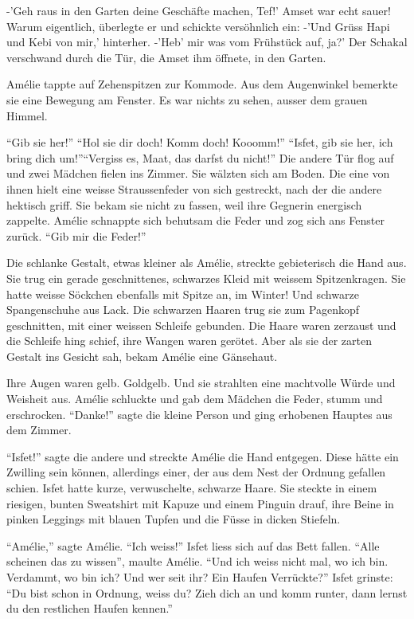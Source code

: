 \documentclass[11pt,titlepage,a5paper]{book}
\begin{document}
-'Geh raus in den Garten deine Geschäfte machen, Tef!' Amset war echt sauer! Warum eigentlich, überlegte er und schickte versöhnlich ein: -'Und Grüss Hapi und Kebi von mir,' hinterher. -'Heb' mir was vom Frühstück auf, ja?' Der Schakal verschwand durch die Tür, die Amset ihm öffnete, in den Garten.

Amélie tappte auf Zehenspitzen zur Kommode. Aus dem Augenwinkel bemerkte sie eine Bewegung am Fenster. Es war nichts zu sehen, ausser dem grauen Himmel.

 "`Gib sie her!"' "`Hol sie dir doch! Komm doch! Kooomm!"' "`Isfet, gib sie her, ich bring dich um!"'"`Vergiss es, Maat, das darfst du nicht!"' Die andere Tür flog auf und zwei Mädchen fielen ins Zimmer. Sie wälzten sich am Boden. Die eine von ihnen hielt eine weisse Straussenfeder von sich gestreckt, nach der die andere hektisch griff. Sie bekam sie nicht zu fassen, weil ihre Gegnerin energisch zappelte. Amélie schnappte sich behutsam die Feder und zog sich ans Fenster zurück. "`Gib mir die Feder!"'

Die schlanke Gestalt, etwas kleiner als Amélie, streckte gebieterisch die Hand aus. Sie trug ein gerade geschnittenes, schwarzes Kleid mit weissem Spitzenkragen. Sie hatte weisse Söckchen ebenfalls mit Spitze an, im Winter! Und schwarze Spangenschuhe aus Lack. Die schwarzen Haaren trug sie zum Pagenkopf geschnitten, mit einer weissen Schleife gebunden. Die Haare waren zerzaust und die Schleife hing schief, ihre Wangen waren gerötet. Aber als sie der zarten Gestalt ins Gesicht sah, bekam Amélie eine Gänsehaut.

 Ihre Augen waren gelb. Goldgelb. Und sie strahlten eine machtvolle Würde und Weisheit aus. Amélie schluckte und gab dem Mädchen die Feder, stumm und erschrocken. "`Danke!"' sagte die kleine Person und ging erhobenen Hauptes aus dem Zimmer. 
 
 "`Isfet!"' sagte die andere und streckte Amélie die Hand entgegen. Diese hätte ein Zwilling sein können, allerdings einer, der aus dem Nest der Ordnung gefallen schien. Isfet hatte kurze, verwuschelte, schwarze Haare. Sie steckte in einem riesigen, bunten Sweatshirt mit Kapuze und einem Pinguin drauf, ihre Beine in pinken Leggings mit blauen Tupfen und die Füsse in dicken Stiefeln.
 
"`Amélie,"' sagte Amélie. "`Ich weiss!"' Isfet liess sich auf das Bett fallen. "`Alle scheinen das zu wissen"', maulte Amélie. "`Und ich weiss nicht mal, wo ich bin. Verdammt, wo bin ich? Und wer seit ihr? Ein Haufen Verrückte?"' Isfet grinste: "`Du bist schon in Ordnung, weiss du? Zieh dich an und komm runter, dann lernst du den restlichen Haufen kennen."'
\end{document}
